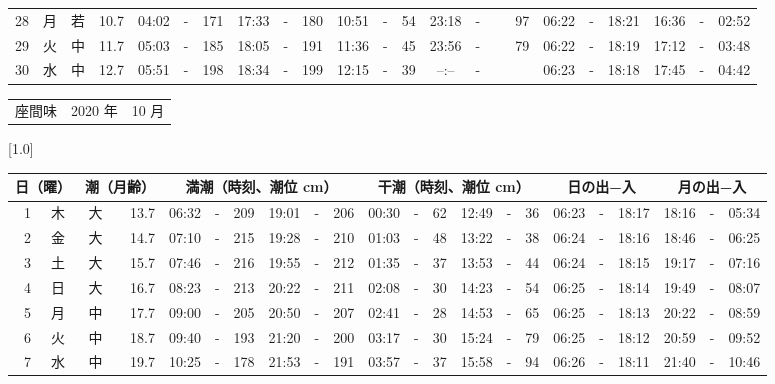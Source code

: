 \documentclass[12pt,a4j]{jsarticle}
\begin{document}
\begin{table}[htbp]
\begin{center}
{\begin{tabular}{|rc|cr|ccrccr|ccrccr|ccc|ccc|}
28 & 月 & 若 & 10.7 &  04:02 &-& 171 &  17:33 &-& 180 &  10:51 &-&  54 &  23:18 &-&  97 & 06:22 & -& 18:21 & 16:36 & -& 02:52 \\
29 & 火 & 中 & 11.7 &  05:03 &-& 185 &  18:05 &-& 191 &  11:36 &-&  45 &  23:56 &-&  79 & 06:22 & -& 18:19 & 17:12 & -& 03:48 \\
30 & 水 & 中 & 12.7 &  05:51 &-& 198 &  18:34 &-& 199 &  12:15 &-&  39 &  --:-- &-&~~~~~ & 06:23 & -& 18:18 & 17:45 & -& 04:42 \\
   \hline
   \end{tabular}}
   \end{center}
\end{table}
\newpage
 \begin{table}[htbp]
 \begin{center}
 \begin{tabular}{lcc}
 \LARGE{座間味}  & \large{2020 年} & \large{10 月} \\
 \end{tabular}
 \end{center}
 \begin{center}
    \scalebox{0.7}[1.0]{
    \begin{tabular}{|rc|cr|ccrccr|ccrccr|ccc|ccc|}
    \hline
    \multicolumn{2}{|c|}{日（曜）} & \multicolumn{2}{c|}{潮（月齢）} & \multicolumn{6}{c|}{満潮（時刻、潮位 cm）} & \multicolumn{6}{c|}{干潮（時刻、潮位 cm）} & \multicolumn{3}{c|}{日の出−入} &  \multicolumn{3}{c|}{月の出−入}\\
 \hline
 1 & 木 & 大 & 13.7 &  06:32 &-& 209 &  19:01 &-& 206 &  00:30 &-&  62 &  12:49 &-&  36 & 06:23 & -& 18:17 & 18:16 & -& 05:34 \\
 2 & 金 & 大 & 14.7 &  07:10 &-& 215 &  19:28 &-& 210 &  01:03 &-&  48 &  13:22 &-&  38 & 06:24 & -& 18:16 & 18:46 & -& 06:25 \\
 3 & 土 & 大 & 15.7 &  07:46 &-& 216 &  19:55 &-& 212 &  01:35 &-&  37 &  13:53 &-&  44 & 06:24 & -& 18:15 & 19:17 & -& 07:16 \\
 4 & 日 & 大 & 16.7 &  08:23 &-& 213 &  20:22 &-& 211 &  02:08 &-&  30 &  14:23 &-&  54 & 06:25 & -& 18:14 & 19:49 & -& 08:07 \\
 5 & 月 & 中 & 17.7 &  09:00 &-& 205 &  20:50 &-& 207 &  02:41 &-&  28 &  14:53 &-&  65 & 06:25 & -& 18:13 & 20:22 & -& 08:59 \\
 6 & 火 & 中 & 18.7 &  09:40 &-& 193 &  21:20 &-& 200 &  03:17 &-&  30 &  15:24 &-&  79 & 06:25 & -& 18:12 & 20:59 & -& 09:52 \\
 7 & 水 & 中 & 19.7 &  10:25 &-& 178 &  21:53 &-& 191 &  03:57 &-&  37 &  15:58 &-&  94 & 06:26 & -& 18:11 & 21:40 & -& 10:46 \\

\end{tabular}}
\end{center}
\end{table}
\end{document}
